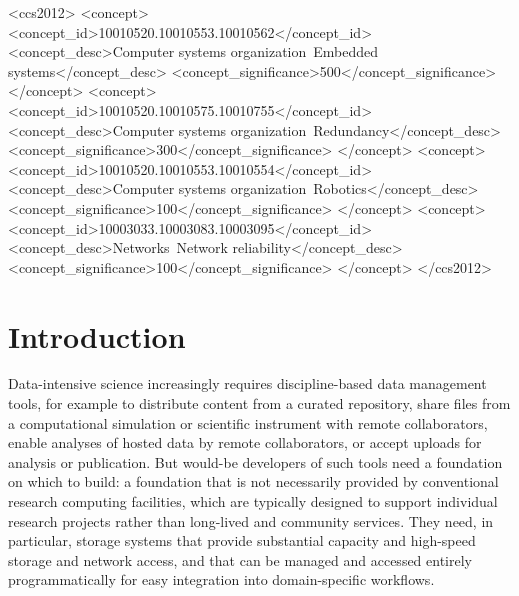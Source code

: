 \documentclass[sigconf]{acmart}
\newcommand\ian[1]{}
\newcommand\ian[1]{{\color{blue}[Ian: #1]}}
\begin{document}
%
%
\begin{CCSXML}
<ccs2012>
 <concept>
  <concept_id>10010520.10010553.10010562</concept_id>
  <concept_desc>Computer systems organization~Embedded systems\ian{TO FIX}</concept_desc>
  <concept_significance>500</concept_significance>
 </concept>
 <concept>
  <concept_id>10010520.10010575.10010755</concept_id>
  <concept_desc>Computer systems organization~Redundancy</concept_desc>
  <concept_significance>300</concept_significance>
 </concept>
 <concept>
  <concept_id>10010520.10010553.10010554</concept_id>
  <concept_desc>Computer systems organization~Robotics</concept_desc>
  <concept_significance>100</concept_significance>
 </concept>
 <concept>
  <concept_id>10003033.10003083.10003095</concept_id>
  <concept_desc>Networks~Network reliability</concept_desc>
  <concept_significance>100</concept_significance>
 </concept>
</ccs2012>  
\end{CCSXML}





\maketitle



\section{Introduction}

Data-intensive science increasingly requires discipline-based data management tools,
for example to distribute content from a curated repository, 
share files from a computational simulation or scientific instrument with remote collaborators,
enable analyses of hosted data by remote collaborators, 
or accept uploads for analysis or publication.
But would-be developers of such tools need a foundation on which to build:
a foundation that is not necessarily provided by 
conventional research computing facilities,
which are typically designed to support individual research projects 
rather than long-lived and community services.
They need, in particular,  
storage systems that provide substantial capacity and
high-speed storage and network access,
and that can be managed and accessed entirely programmatically
for easy integration into domain-specific workflows.
\end{document}

